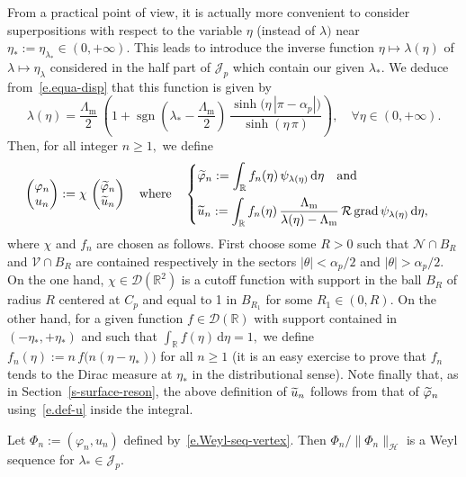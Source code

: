 \documentclass[AHL,Unicode,longabstracts]{cedram}
\DeclareMathOperator{\sgn}{sgn}
\DeclareMathOperator{\grad}{grad}
\newcommand{\calD}{\mathcal{D}}
\newcommand{\calH}{\mathcal{H}}
\newcommand{\calJ}{\mathcal{J}}
\newcommand{\calN}{\mathcal{N}}
\newcommand{\calR}{\mathcal{R}}
\newcommand{\calV}{\mathcal{V}}
\newcommand{\bbR}{\mathbb{R}}
\newcommand{\rmd}{{\mathrm{d}}}
\newcommand{\Lm}{{\Lambda_{\mathrm{m}}}}
\let\oldtilde\tilde
\renewcommand*{\tilde}[1]{\mathchoice{\widetilde{#1}}{\widetilde{#1}}{\oldtilde{#1}}{\oldtilde{#1}}}
\let\oldforall\forall
\renewcommand*{\forall}{\mathrel{\oldforall}}
\begin{document}
From a practical point of view, it is actually more convenient to consider superpositions with respect to the variable $\eta$ (instead of $\lambda)$ near $\eta_* := \eta_{\lambda_*} \in (0,+\infty).$ This leads to introduce the inverse function $\eta \mapsto \lambda(\eta)$ of $\lambda \mapsto \eta_\lambda$ considered in the half part of $\calJ_p$ which contain our given $\lambda_*.$ We deduce from~\eqref{e.equa-disp} that this function is given by
\[
\lambda(\eta) = \frac{\Lm}{2}\ \left(1 + \sgn\left(\lambda_* - \frac{\Lm}{2}\right) \
\frac{\sinh\big(\eta\,|\pi-\alpha_p|\big)}{\sinh(\eta\,\pi)}
\right),
\quad\forall \eta \in (0,+\infty).
\]
Then, for all integer $n \geq 1,$ we define
\begin{equation}\label{e.Weyl-seq-vertex}
\begin{pmatrix} \varphi_n \\ u_n
\end{pmatrix}
:= \chi\,
\begin{pmatrix} \tilde \varphi_n \\ \tilde u_n
\end{pmatrix}
\quad\text{where}\quad
\begin{cases}
\displaystyle \tilde\varphi_n := \int_\bbR f_n(\eta)\, \psi_{\lambda(\eta)} \,\rmd\eta \quad\text{and} \\[10pt]
\displaystyle \tilde u_n := \int_\bbR f_n(\eta)\, \frac{\Lm}{\lambda(\eta)-\Lm}\,\calR \grad\psi_{\lambda(\eta)} \,\rmd\eta,
\end{cases}
\end{equation}
where $\chi$ and $f_n$ are chosen as follows. First choose some $R>0$ such that $\calN \cap B_R$ and $\calV \cap B_R$ are contained respectively in the sectors $|\theta| < \alpha_p/2$ and $|\theta| > \alpha_p/2$. On the one hand, $\chi \in \calD(\bbR^2)$ is a cutoff function with support in the ball $B_R$ of radius $R$ centered at $C_p$ and equal to 1 in $B_{R_1}$ for some $R_1 \in (0,R).$ On the other hand, for a given function $f \in \calD(\bbR)$ with support contained in $(-\eta_*,+\eta_*)$ and such that $\int_\bbR f(\eta) \,\rmd\eta = 1,$ we define $f_n(\eta) := n\,f\big(n(\eta-\eta_*)\big)$ for all $n \geq 1$ (it is an easy exercise to prove that $f_n$ tends to the Dirac measure at $\eta_*$ in the distributional sense). Note finally that, as in Section~\ref{s-surface-reson}, the above definition of $\tilde u_n$ follows from that of $\tilde\varphi_n$ using~\eqref{e.def-u} inside the integral.

\begin{prop}\label{p-Weyl-inner-corner}
Let $\Phi_n := (\varphi_n,u_n)$ defined by~\eqref{e.Weyl-seq-vertex}. Then $\Phi_n/\|\Phi_n\|_\calH$ is a Weyl sequence for $\lambda_* \in \calJ_p.$
\end{prop}
\end{document}
